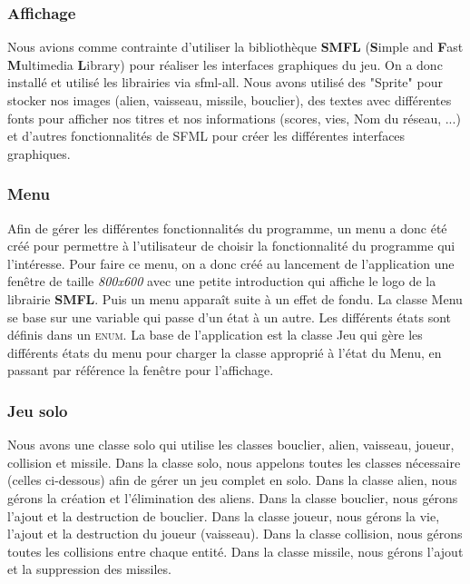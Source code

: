 \documentclass[french, 11pt]{report}
\begin{document}
			\subsubsection{Affichage}
				Nous avions comme contrainte d'utiliser la bibliothèque \textbf{SMFL} (\textbf{S}imple and \textbf{F}ast \textbf{M}ultimedia \textbf{L}ibrary) pour réaliser les interfaces graphiques du jeu.
				On a donc installé et utilisé les librairies via sfml-all.
				Nous avons utilisé des "Sprite" pour stocker nos images (alien, vaisseau, missile, bouclier), des textes avec différentes fonts pour afficher nos titres et nos informations (scores, vies, Nom du réseau, ...) et d'autres fonctionnalités de SFML pour créer les différentes interfaces graphiques.
				
			\subsubsection{Menu}
				Afin de gérer les différentes fonctionnalités du programme, un menu a donc été créé pour permettre à l'utilisateur de choisir la fonctionnalité du programme qui l'intéresse. Pour faire ce menu, on a donc créé au lancement de l'application une fenêtre de taille \textit{800x600} avec une petite introduction qui affiche le logo de la librairie \textbf{SMFL}. 
				Puis un menu apparaît suite à un effet de fondu. La classe Menu se base sur une variable qui passe d'un état à un autre. 
				Les différents états sont définis dans un \textsc{enum}. 
				La base de l'application est la classe Jeu qui gère les différents états du menu pour charger la classe approprié à l'état du Menu, en passant par référence la fenêtre pour l'affichage.
				
			
			\subsubsection{Jeu solo}
				Nous avons une classe solo qui utilise les classes bouclier, alien, vaisseau, joueur, collision et missile.
				Dans la classe solo, nous appelons toutes les classes nécessaire (celles ci-dessous) afin de gérer un jeu complet en solo.
				Dans la classe alien, nous gérons la création et l'élimination des aliens.
				Dans la classe bouclier, nous gérons l'ajout et la destruction de bouclier.
				Dans la classe joueur, nous gérons la vie, l'ajout et la destruction du joueur (vaisseau).
				Dans la classe collision, nous gérons toutes les collisions entre chaque entité.
				Dans la classe missile, nous gérons l'ajout et la suppression des missiles.
				
\end{document}
